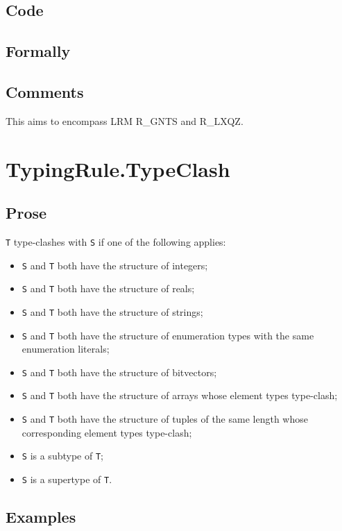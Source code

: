 \documentclass{book}
\begin{document}
  \subsection{Code}

  \subsection{Formally}
  
  \subsection{Comments}
  This aims to encompass LRM R\_GNTS and R\_LXQZ.

\section{TypingRule.TypeClash}

  \subsection{Prose}
  \texttt{T} type-clashes with \texttt{S} if one of the following applies:
  \begin{itemize}
  \item \texttt{S} and \texttt{T} both have the structure of integers;
  \item \texttt{S} and \texttt{T} both have the structure of reals;
  \item \texttt{S} and \texttt{T} both have the structure of strings;
  \item \texttt{S} and \texttt{T} both have the structure of enumeration types with the same enumeration literals;
  \item \texttt{S} and \texttt{T} both have the structure of bitvectors;
  \item \texttt{S} and \texttt{T} both have the structure of arrays whose element types type-clash;
  \item \texttt{S} and \texttt{T} both have the structure of tuples of the same length whose
    corresponding element types type-clash;
  \item \texttt{S} is a subtype of \texttt{T};
  \item \texttt{S} is a supertype of \texttt{T}.
  \end{itemize}

  \subsection{Examples}
\end{document}
